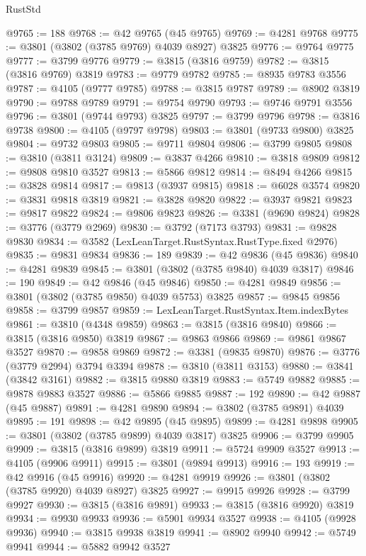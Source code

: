 \begin{lexlean}{RustStd}
\begin{coremodule}
@9765 := 188
@9768 := @42 @9765 (@45 @9765)
@9769 := @4281 @9768
@9775 := @3801 (@3802 (@3785 @9769) @4039 @8927) @3825
@9776 := @9764 @9775
@9777 := @3799 @9776
@9779 := @3815 (@3816 @9759)
@9782 := @3815 (@3816 @9769) @3819
@9783 := @9779 @9782
@9785 := @8935 @9783 @3556
@9787 := @4105 (@9777 @9785)
@9788 := @3815 @9787
@9789 := @8902 @3819
@9790 := @9788 @9789
@9791 := @9754 @9790
@9793 := @9746 @9791 @3556
@9796 := @3801 (@9744 @9793) @3825
@9797 := @3799 @9796
@9798 := @3816 @9738
@9800 := @4105 (@9797 @9798)
@9803 := @3801 (@9733 @9800) @3825
@9804 := @9732 @9803
@9805 := @9711 @9804
@9806 := @3799 @9805
@9808 := @3810 (@3811 @3124)
@9809 := @3837 @4266
@9810 := @3818 @9809
@9812 := @9808 @9810 @3527
@9813 := @5866 @9812
@9814 := @8494 @4266
@9815 := @3828 @9814
@9817 := @9813 (@3937 @9815)
@9818 := @6028 @3574
@9820 := @3831 @9818 @3819
@9821 := @3828 @9820
@9822 := @3937 @9821
@9823 := @9817 @9822
@9824 := @9806 @9823
@9826 := @3381 (@9690 @9824)
@9828 := @3776 (@3779 @2969)
@9830 := @3792 (@7173 @3793)
@9831 := @9828 @9830
@9834 := @3582 (LexLeanTarget.RustSyntax.RustType.fixed @2976)
@9835 := @9831 @9834
@9836 := 189
@9839 := @42 @9836 (@45 @9836)
@9840 := @4281 @9839
@9845 := @3801 (@3802 (@3785 @9840) @4039 @3817)
@9846 := 190
@9849 := @42 @9846 (@45 @9846)
@9850 := @4281 @9849
@9856 := @3801 (@3802 (@3785 @9850) @4039 @5753) @3825
@9857 := @9845 @9856
@9858 := @3799 @9857
@9859 := LexLeanTarget.RustSyntax.Item.indexBytes
@9861 := @3810 (@4348 @9859)
@9863 := @3815 (@3816 @9840)
@9866 := @3815 (@3816 @9850) @3819
@9867 := @9863 @9866
@9869 := @9861 @9867 @3527
@9870 := @9858 @9869
@9872 := @3381 (@9835 @9870)
@9876 := @3776 (@3779 @2994) @3794 @3394
@9878 := @3810 (@3811 @3153)
@9880 := @3841 (@3842 @3161)
@9882 := @3815 @9880 @3819
@9883 := @5749 @9882
@9885 := @9878 @9883 @3527
@9886 := @5866 @9885
@9887 := 192
@9890 := @42 @9887 (@45 @9887)
@9891 := @4281 @9890
@9894 := @3802 (@3785 @9891) @4039
@9895 := 191
@9898 := @42 @9895 (@45 @9895)
@9899 := @4281 @9898
@9905 := @3801 (@3802 (@3785 @9899) @4039 @3817) @3825
@9906 := @3799 @9905
@9909 := @3815 (@3816 @9899) @3819
@9911 := @5724 @9909 @3527
@9913 := @4105 (@9906 @9911)
@9915 := @3801 (@9894 @9913)
@9916 := 193
@9919 := @42 @9916 (@45 @9916)
@9920 := @4281 @9919
@9926 := @3801 (@3802 (@3785 @9920) @4039 @8927) @3825
@9927 := @9915 @9926
@9928 := @3799 @9927
@9930 := @3815 (@3816 @9891)
@9933 := @3815 (@3816 @9920) @3819
@9934 := @9930 @9933
@9936 := @5901 @9934 @3527
@9938 := @4105 (@9928 @9936)
@9940 := @3815 @9938 @3819
@9941 := @8902 @9940
@9942 := @5749 @9941
@9944 := @5882 @9942 @3527

\end{coremodule}
\end{lexlean}
